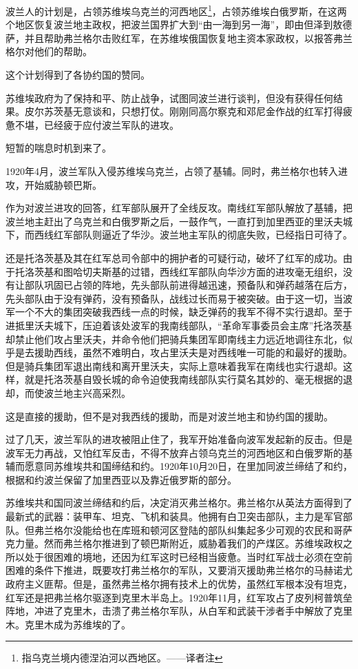波兰人的计划是，占领苏维埃乌克兰的河西地区\footnote{指乌克兰境内德涅泊河以西地区。——译者注}，占领苏维埃白俄罗斯，在这两个地区恢复波兰地主政权，把波兰国界扩大到“由一海到另一海”，即由但泽到敖德萨，并且帮助弗兰格尔击败红军，在苏维埃俄国恢复地主资本家政权，以报答弗兰格尔对他们的帮助。

这个计划得到了各协约国的赞同。

苏维埃政府为了保持和平、防止战争，试图同波兰进行谈判，但没有获得任何结果。皮尔苏茨基无意谈和，只想打仗。刚刚同高尔察克和邓尼金作战的红军打得疲惫不堪，已经疲于应付波兰军队的进攻。

短暂的喘息时机到来了。

1920年4月，波兰军队入侵苏维埃乌克兰，占领了基辅。同时，弗兰格尔也转入进攻，开始威胁顿巴斯。

作为对波兰进攻的回答，红军部队展开了全线反攻。南线红军部队解放了基辅，把波兰地主赶出了乌克兰和白俄罗斯之后，一鼓作气，一直打到加里西亚的里沃夫城下，而西线红军部队则逼近了华沙。波兰地主军队的彻底失败，已经指日可待了。

还是托洛茨基及其在红军总司令部中的拥护者的可疑行动，破坏了红军的成功。由于托洛茨基和图哈切夫斯基的过错，西线红军部队向华沙方面的进攻毫无组织，没有让部队巩固已占领的阵地，先头部队前进得越迅速，预备队和弹药越落在后方，先头部队由于没有弹药，没有预备队，战线过长而易于被突破。由于这一切，当波军一个不大的集团突破我西线一点的时候，缺乏弹药的我军不得不实行退却。至于进抵里沃夫城下，压迫着该处波军的我南线部队，“革命军事委员会主席”托洛茨基却禁止他们攻占里沃夫，并命令他们把骑兵集团军即南线主力远近地调往东北，似乎是去援助西线，虽然不难明白，攻占里沃夫是对西线唯一可能的和最好的援助。但是骑兵集团军退出南线和离开里沃夫，实际上意味着我军在南线也实行退却。这样，就是托洛茨基自毁长城的命令迫使我南线部队实行莫名其妙的、毫无根据的退却，而使波兰地主兴高采烈。

这是直接的援助，但不是对我西线的援助，而是对波兰地主和协约国的援助。

过了几天，波兰军队的进攻被阻止住了，我军开始准备向波军发起新的反击。但是波军无力再战，又怕红军反击，不得不放弃占领乌克兰的河西地区和白俄罗斯的基辅而愿意同苏维埃共和国缔结和约。1920年10月20日，在里加同波兰缔结了和约，根据和约波兰保留了加里西亚以及靠近俄罗斯的部分。

苏维埃共和国同波兰缔结和约后，决定消灭弗兰格尔。弗兰格尔从英法方面得到了最新式的武器：装甲车、坦克、飞机和装具。他拥有白卫突击部队，主力是军官部队。但弗兰格尔没能给也在库班和顿河区登陆的部队纠集起多少可观的农民和哥萨克力量。然而弗兰格尔推进到了顿巴斯附近，威胁着我们的产煤区。苏维埃政权之所以处于很困难的境地，还因为红军这时已经相当疲惫。当时红军战士必须在空前困难的条件下推进，既要攻打弗兰格尔的军队，又要消灭援助弗兰格尔的马赫诺尤政府主义匪帮。但是，虽然弗兰格尔拥有技术上的优势，虽然红军根本没有坦克，红军还是把弗兰格尔驱逐到克里木半岛上。1920年11月，红军攻占了皮列柯普筑垒阵地，冲进了克里木，击溃了弗兰格尔军队，从白军和武装干涉者手中解放了克里木。克里木成为苏维埃的了。


